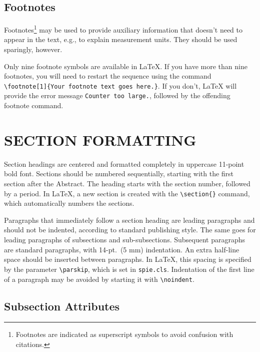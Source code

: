 \documentclass[]{spie}  %
\begin{document}
\subsection{Footnotes} 
Footnotes\footnote{Footnotes are indicated as superscript symbols to avoid confusion with citations.} may be used to provide auxiliary information that doesn't need to appear in the text, e.g., to explain measurement units.  They should be used sparingly, however.  

Only nine footnote symbols are available in LaTeX. If you have more than nine footnotes, you will need to restart the sequence using the command  \verb|\footnote[1]{Your footnote text goes here.}|. If you don't, LaTeX will provide the error message {\tt Counter too large.}, followed by the offending footnote command.

\section{SECTION FORMATTING} \label{sec:sections}

Section headings are centered and formatted completely in uppercase 11-point bold font.  Sections should be numbered sequentially, starting with the first section after the Abstract.  The heading starts with the section number, followed by a period.  In LaTeX, a new section is created with the \verb|\section{}| command, which automatically numbers the sections.

Paragraphs that immediately follow a section heading are leading paragraphs and should not be indented, according to standard publishing style\cite{Lamport94}.  The same goes for leading paragraphs of subsections and sub-subsections.  Subsequent paragraphs are standard paragraphs, with 14-pt.\ (5 mm) indentation.  An extra half-line space should be inserted between paragraphs.  In LaTeX, this spacing is specified by the parameter \verb|\parskip|, which is set in {\tt spie.cls}.  Indentation of the first line of a paragraph may be avoided by starting it with \verb|\noindent|.
 
\subsection{Subsection Attributes} 
\end{document}
